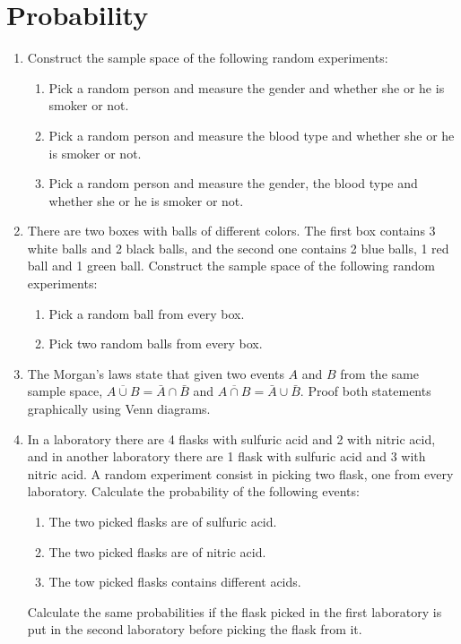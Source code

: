 
\section{Probability}
\begin{enumerate}[leftmargin=*,resume]
\item Construct the sample space of the following random experiments:
\begin{enumerate}
\item Pick a random person and measure the gender and whether she or he is smoker or not. 
\item Pick a random person and measure the blood type and whether she or he is smoker or not.
\item Pick a random person and measure the gender, the blood type and whether she or he is smoker or not.
\end{enumerate}

\item There are two boxes with balls of different colors. 
The first box contains 3 white balls and 2 black balls, and the second one contains 2 blue balls, 1 red ball and 1 green
ball. 
Construct the sample space of the following random experiments:
\begin{enumerate}
\item Pick a random ball from every box. 
\item Pick two random balls from every box.
\end{enumerate}

\item The Morgan's laws state that given two events $A$ and $B$ from the same sample space, $\overline{A\cup B}=\bar A
\cap \bar B$ and $\overline{A\cap B}=\bar A \cup \bar B$.
Proof both statements graphically using Venn diagrams. 

\item In a laboratory there are 4 flasks with sulfuric acid and 2 with nitric acid, and in another laboratory there are
1 flask with sulfuric acid and 3 with nitric acid. 
A random experiment consist in picking two flask, one from every laboratory. 
Calculate the probability of the following events:

\begin{enumerate}
\item The two picked flasks are of sulfuric acid.
\item The two picked flasks are of nitric acid.
\item The tow picked flasks contains different acids.
\end{enumerate}
Calculate the same probabilities if the flask picked in the first laboratory is put in the second laboratory before
picking the flask from it. 


\end{enumerate}

